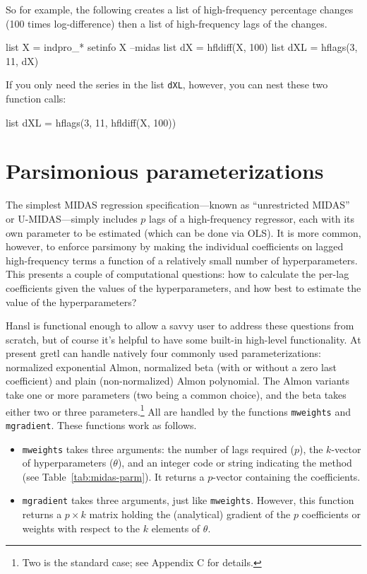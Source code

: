 \documentclass{article}
\begin{document}
So for example, the following creates a list of high-frequency
percentage changes (100 times log-difference) then a list of
high-frequency lags of the changes.
%
\begin{code}
list X = indpro_*
setinfo X --midas
list dX = hfldiff(X, 100)
list dXL = hflags(3, 11, dX)
\end{code}

If you only need the series in the list \texttt{dXL}, however, you can
nest these two function calls:
%
\begin{code}
list dXL = hflags(3, 11, hfldiff(X, 100))
\end{code}

\section{Parsimonious parameterizations}
\label{sec:hparams}

The simplest MIDAS regression specification---known as ``unrestricted
MIDAS'' or U-MIDAS---simply includes $p$ lags of a high-frequency
regressor, each with its own parameter to be estimated (which can be
done via OLS). It is more common, however, to enforce parsimony by
making the individual coefficients on lagged high-frequency terms a
function of a relatively small number of hyperparameters. This
presents a couple of computational questions: how to calculate the
per-lag coefficients given the values of the hyperparameters, and how
best to estimate the value of the hyperparameters?

Hansl is functional enough to allow a savvy user to address these
questions from scratch, but of course it's helpful to have some
built-in high-level functionality. At present gretl can handle
natively four commonly used parameterizations: normalized exponential
Almon, normalized beta (with or without a zero last coefficient) and
plain (non-normalized) Almon polynomial. The Almon variants take one
or more parameters (two being a common choice), and the beta takes
either two or three parameters.\footnote{Two is the standard case; see
  Appendix C for details.}  All are handled by the functions
\texttt{mweights} and \texttt{mgradient}. These functions work as
follows.
\begin{itemize}
\item \texttt{mweights} takes three arguments: the number of lags
  required ($p$), the $k$-vector of hyperparameters ($\theta$), and an
  integer code or string indicating the method (see
  Table~\ref{tab:midas-parm}). It returns a $p$-vector containing the
  coefficients.
\item \texttt{mgradient} takes three arguments, just like
  \texttt{mweights}. However, this function returns a $p \times k$
  matrix holding the (analytical) gradient of the $p$ coefficients or
  weights with respect to the $k$ elements of $\theta$.
\end{itemize}
\end{document}

